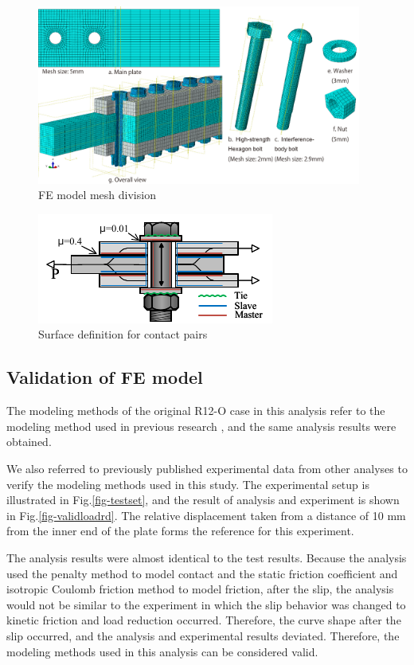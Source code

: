 \begin{figure}[htbp]
    \centering
    \includegraphics[width=0.95\textwidth]{imgs/ch5/femesh.pdf}
    \caption{FE model mesh division}
    \label{fig-femesh}
\end{figure}

\begin{figure}[htbp]
    \centering
    \includegraphics[width=0.5\linewidth]{imgs/ch5/contactp.pdf}
    \caption{Surface definition for contact pairs}
    \label{fig-contactp}
\end{figure}

\subsection{Validation of FE model}

The modeling methods of  the original R12-O case in this analysis refer to the modeling method used in previous research \cite{Peng2013FeaDimensions}, and the same analysis results were obtained.

We also referred to previously published experimental data \cite{peng2010} from other analyses to verify the modeling methods used in this study. The experimental setup is illustrated in Fig.\ref{fig-testset}, and the result of analysis and experiment is shown in Fig.\ref{fig-validloadrd}. The relative displacement taken from a distance of 10 mm from the inner end of the plate forms the reference for this experiment.

The analysis results were almost identical to the test results. Because the analysis used the penalty method to model contact and the static friction coefficient and isotropic Coulomb friction method to model friction, after the slip, the analysis would not be similar to the experiment in which the slip behavior was changed to kinetic friction and load reduction occurred. Therefore, the curve shape after the slip occurred, and the analysis and experimental results deviated. Therefore, the modeling methods used in this analysis can be considered valid.

